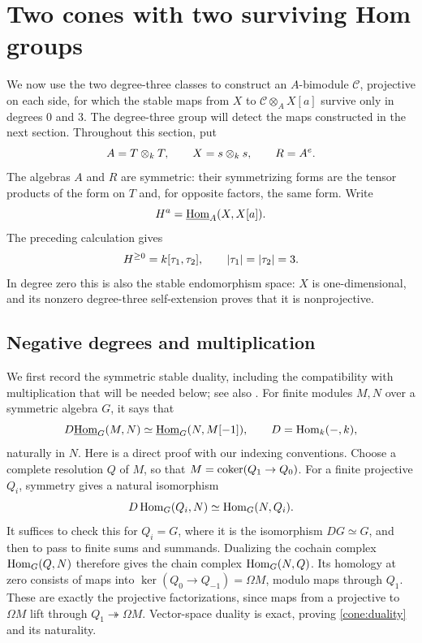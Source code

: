 \section{Two cones with two surviving Hom groups}
\label{cone:section}

We now use the two degree-three classes to construct an $A$-bimodule
$\mathcal C$, projective on each side, for which the stable maps from $X$
to $\mathcal C\otimes_A X[a]$ survive only in degrees $0$ and $3$.
The degree-three group will detect the maps constructed in the next section.
Throughout this section, put
\[
 A=T\otimes_{k}T,\qquad X=s\otimes_{k}s,\qquad R=A^e.
\]
The algebras $A$ and $R$ are symmetric: their symmetrizing forms are the
tensor products of the form on $T$ and, for opposite factors, the same form.
Write
\[
 H^a=\underline{\operatorname{Hom}}_{A}(X,X[a]).
\]
The preceding calculation gives
\begin{equation}
 H^{\geq0}=k[\tau_1,\tau_2],\qquad |\tau_1|=|\tau_2|=3.
 \label{cone:positive-ring}
\end{equation}
In degree zero this is also the stable endomorphism space: $X$ is one-dimensional,
and its nonzero degree-three self-extension proves that it is nonprojective.

\subsection{Negative degrees and multiplication}

We first record the symmetric stable duality, including the compatibility
with multiplication that will be needed below; see also
\cite[Section~2]{Linckelmann2013}.
For finite modules $M,N$ over a symmetric algebra $G$, it says that
\begin{equation}
 D\underline{\operatorname{Hom}}_{G}(M,N)\simeq\underline{\operatorname{Hom}}_{G}(N,M[-1]),
 \qquad D=\operatorname{Hom}_{k}(-,k),
 \label{cone:duality}
\end{equation}
naturally in $N$.
Here is a direct proof with our indexing conventions. Choose a complete
resolution $Q$ of $M$, so that $M=\operatorname{coker}(Q_1\to Q_0)$.
For a finite projective $Q_i$, symmetry gives a natural isomorphism
\[
 D\operatorname{Hom}_G(Q_i,N)\simeq\operatorname{Hom}_G(N,Q_i).
\]
It suffices to check this for $Q_i=G$, where it is the isomorphism
$DG\simeq G$, and then to pass to finite sums and summands.
Dualizing the cochain complex $\operatorname{Hom}_G(Q,N)$ therefore gives the chain
complex $\operatorname{Hom}_G(N,Q)$. Its homology at zero consists of maps into
$\ker(Q_0\to Q_{-1})=\Omega M$, modulo maps through $Q_1$.
These are exactly the projective factorizations, since maps from a projective
to $\Omega M$ lift through $Q_1\twoheadrightarrow\Omega M$.
Vector-space duality is exact, proving \eqref{cone:duality} and its naturality.

